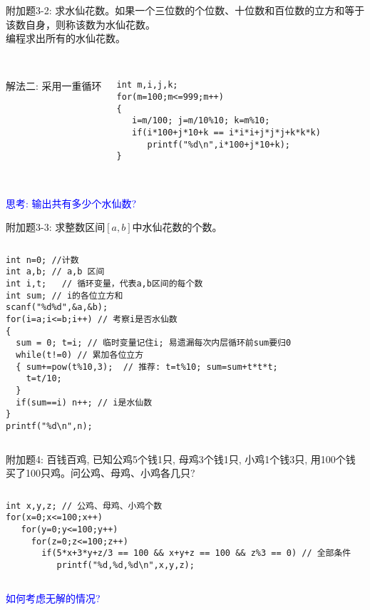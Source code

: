 \begin{frame}[fragile]
附加题3-2: 求水仙花数。如果一个三位数的个位数、十位数和百位数的立方和等于该数自身，则称该数为水仙花数。 \\
编程求出所有的水仙花数。\\
~\\ 
\pause
\begin{columns}
解法二: 采用一重循环
\begin{lstlisting}
int m,i,j,k; 
for(m=100;m<=999;m++)
{
   i=m/100; j=m/10%10; k=m%10;  
   if(i*100+j*10+k == i*i*i+j*j*j+k*k*k)  
      printf("%d\n",i*100+j*10+k);
}
\end{lstlisting}
\end{columns}
~\\
\pause
\textcolor{blue}{思考: 输出共有多少个水仙数?}
\end{frame}

\begin{frame}[fragile]
附加题3-3: 求整数区间$[a,b]$中水仙花数的个数。
\pause
\begin{columns}
\begin{lstlisting}
int n=0; //计数 
int a,b; // a,b 区间
int i,t;   // 循环变量，代表a,b区间的每个数
int sum; // i的各位立方和 
scanf("%d%d",&a,&b);
for(i=a;i<=b;i++) // 考察i是否水仙数
{  
  sum = 0; t=i; // 临时变量记住i; 易遗漏每次内层循环前sum要归0
  while(t!=0) // 累加各位立方 
  { sum+=pow(t%10,3);  // 推荐: t=t%10; sum=sum+t*t*t; 
    t=t/10; 
  }
  if(sum==i) n++; // i是水仙数 
}
printf("%d\n",n);
\end{lstlisting}
\end{columns}
\end{frame}

\begin{frame}[fragile]
附加题4: 百钱百鸡, 已知公鸡5个钱1只, 母鸡3个钱1只, 小鸡1个钱3只, 用100个钱买了100只鸡。问公鸡、母鸡、小鸡各几只? 
\vspace{0.5cm}
\pause
\begin{columns}
\begin{lstlisting}
int x,y,z; // 公鸡、母鸡、小鸡个数
for(x=0;x<=100;x++) 
   for(y=0;y<=100;y++) 
     for(z=0;z<=100;z++) 
       if(5*x+3*y+z/3 == 100 && x+y+z == 100 && z%3 == 0) // 全部条件 
          printf("%d,%d,%d\n",x,y,z);
\end{lstlisting}
\end{columns}
\vspace{0.5cm}
\pause
\textcolor{blue}{如何考虑无解的情况?}
\end{frame}

